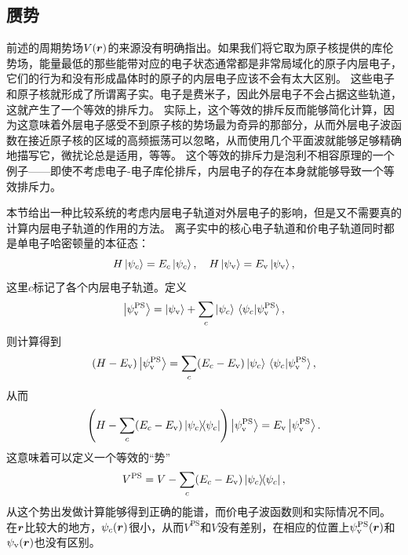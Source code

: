 \subsection{赝势}\label{sec:pseudopotential}

前述的周期势场$V(\vb*{r})$的来源没有明确指出。如果我们将它取为原子核提供的库伦势场，能量最低的那些能带对应的电子状态通常都是非常局域化的原子内层电子，它们的行为和没有形成晶体时的原子的内层电子应该不会有太大区别。
这些电子和原子核就形成了所谓离子实。电子是费米子，因此外层电子不会占据这些轨道，这就产生了一个等效的排斥力。
实际上，这个等效的排斥反而能够简化计算，因为这意味着外层电子感受不到原子核的势场最为奇异的那部分，从而外层电子波函数在接近原子核的区域的高频振荡可以忽略，从而使用几个平面波就能够足够精确地描写它，微扰论总是适用，等等。
这个等效的排斥力是泡利不相容原理的一个例子——即使不考虑电子-电子库伦排斥，内层电子的存在本身就能够导致一个等效排斥力。

本节给出一种比较系统的考虑内层电子轨道对外层电子的影响，但是又不需要真的计算内层电子轨道的作用的方法。
离子实中的核心电子轨道和价电子轨道同时都是单电子哈密顿量的本征态：
\begin{equation}
    H \ket{\psi_c} = E_c \ket{\psi_c}, \quad H \ket{\psi_\text{v}} = E_\text{v} \ket{\psi_\text{v}},
\end{equation}
这里$c$标记了各个内层电子轨道。定义
\begin{equation}
    \ket{\psi_\text{v}^\text{PS}} = \ket{\psi_\text{v}} + \sum_c \ket{\psi_c} \braket*{\psi_c}{\psi_\text{v}^\text{PS}},
\end{equation}
则计算得到
\[
    (H - E_\text{v}) \ket{\psi_\text{v}^\text{PS}} = \sum_c (E_c - E_\text{v}) \ket{\psi_c} \braket*{\psi_c}{\psi_\text{v}^\text{PS}},
\]
从而
\begin{equation}
    \left(H - \sum_c (E_c - E_\text{v}) \dyad*{\psi_c}\right) \ket{\psi_\text{v}^\text{PS}} = E_\text{v} \ket{\psi_\text{v}^\text{PS}}.
    \label{eq:original-pseudopotential}
\end{equation}
这意味着可以定义一个等效的“势”
\begin{equation}
    V^\text{PS} = V - \sum_c (E_c - E_\text{v}) \dyad*{\psi_c},
\end{equation}
从这个势出发做计算能够得到正确的能谱，而价电子波函数则和实际情况不同。
在$\vb*{r}$比较大的地方，$\psi_c(\vb*{r})$很小，从而$V^\text{PS}$和$V$没有差别，在相应的位置上$\psi_\text{v}^\text{PS}(\vb*{r})$和$\psi_\text{v}(\vb*{r})$也没有区别。

